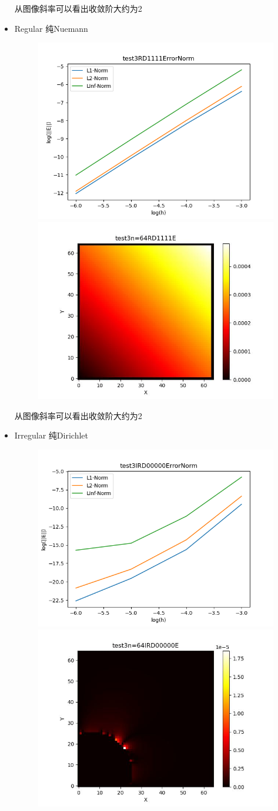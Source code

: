 \documentclass{article}
\begin{document}
\begin{itemize}
    从图像斜率可以看出收敛阶大约为2
    \item Regular 纯Nuemann
    \begin{figure}[h]
        \centering
        \includegraphics[width=0.35\linewidth]{test3RD1111ErrorNormjpg.png}
        \includegraphics[width=0.35\linewidth]{test3n=64RD1111E.jpg}
    \end{figure}

    从图像斜率可以看出收敛阶大约为2
    \item Irregular 纯Dirichlet
    \begin{figure}[h]
        \centering
        \includegraphics[width=0.35\linewidth]{test3IRD00000ErrorNormjpg.png}
        \includegraphics[width=0.35\linewidth]{test3n=64IRD00000E.jpg}
    \end{figure}


\end{itemize}
\end{document}
